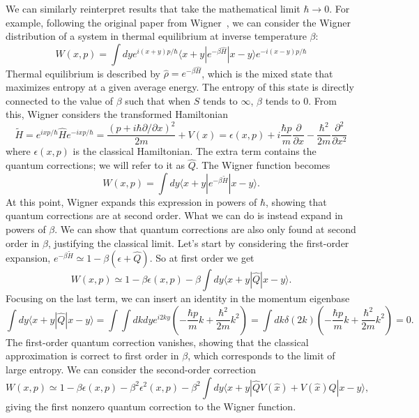 \documentclass{SciPost}
\begin{document}
We can similarly reinterpret results that take the mathematical limit $\hbar \to 0$. For example, following the original paper from Wigner~\cite{WignerLimit}, we can consider the Wigner distribution of a system in thermal equilibrium at inverse temperature $\beta$:
\begin{equation}
	W(x,p)=\int dy e^{i(x+y)p/\hbar}\langle x+y |e^{-\beta\hat{H}}|x-y \rangle e^{-i(x-y)p/\hbar}
\end{equation}
Thermal equilibrium is described by $\hat{\rho}=e^{-\beta \hat{H}}$, which is the mixed state that maximizes entropy at a given average energy. The entropy of this state is directly connected to the value of $\beta$ such that when $S$ tends to $\infty$, $\beta$ tends to 0.
From this, Wigner considers the transformed Hamiltonian
\begin{equation}
	\tilde{H}=e^{i x p/\hbar}\hat{H} e^{-i x p/\hbar}=\frac{(p+i\hbar\partial/\partial x)^2}{2m}+V(x)=\epsilon(x,p)+i\frac{\hbar p}{m}\frac{\partial}{\partial x}-\frac{\hbar^2}{2m}\frac{\partial^2}{\partial x^2}
\end{equation}
where $\epsilon(x,p)$ is the classical Hamiltonian. The extra term contains the quantum corrections; we will refer to it as $\hat{Q}$. The Wigner function becomes
\begin{equation}
	W(x,p)=\int dy \langle x+y |e^{-\beta\tilde{H}}|x-y \rangle. 
\end{equation}
At this point, Wigner expands this expression in powers of $\hbar$, showing that quantum corrections are at second order. What we can do is instead expand in powers of $\beta$. We can show that quantum corrections are also only found at second order in $\beta$, justifying the classical limit. Let's start by considering the first-order expansion, $e^{-\beta\tilde{H}}\simeq 1-\beta(\epsilon+\hat{Q})$. So at first order
we get
\begin{equation}
	W(x,p)\simeq 1-\beta \epsilon(x,p)-\beta\int dy\langle x+y |\hat{Q}|x-y \rangle.
\end{equation}
Focusing on the last term, we can insert an identity in the momentum eigenbase
\begin{equation}
	\int dy\langle x+y |\hat{Q}|x-y \rangle=\int\int dkdy e^{i2ky} \left(-\frac{\hbar p}{m}k+\frac{\hbar^2}{2m}k^2\right)=\int dk \delta(2k) \left(-\frac{\hbar p}{m}k+\frac{\hbar^2}{2m}k^2\right)=0.
\end{equation}
The first-order quantum correction vanishes, showing that the classical approximation is correct to first order in $\beta$, which corresponds to the limit of large entropy. We can consider the second-order correction
\begin{equation}
	W(x,p)\simeq 1-\beta \epsilon(x,p)-\beta^2\epsilon^2(x,p)-\beta^2\int dy\langle x+y |\hat{Q}V(\hat{x})+V(\hat{x}) \hat{Q}|x-y \rangle,
\end{equation}
giving the first nonzero quantum correction to the Wigner function.
\end{document}
